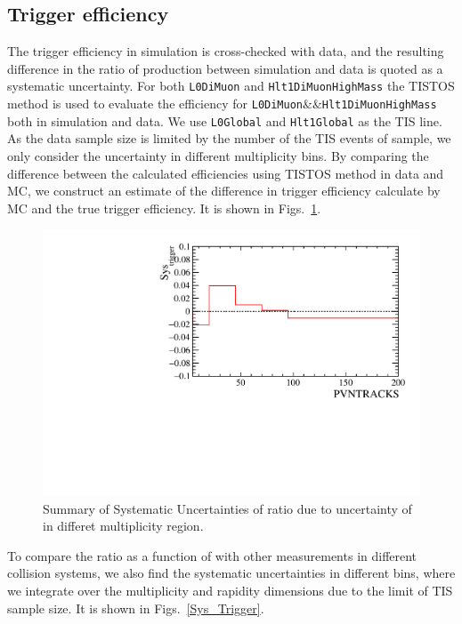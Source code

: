 \subsection{Trigger efficiency}
The trigger efficiency in simulation is cross-checked with data, and the resulting difference in the ratio of production between simulation and data is quoted as a systematic uncertainty. 
For both \texttt{L0DiMuon} and \texttt{Hlt1DiMuonHighMass} the TISTOS method is used to evaluate the efficiency for \texttt{L0DiMuon}\&\&\texttt{Hlt1DiMuonHighMass} both in simulation and data. 
We use \texttt{L0Global} and \texttt{Hlt1Global} as the TIS line.
As the data sample size is limited by the number of the TIS events of \psitwos sample, we only consider the uncertainty in different multiplicity bins. 
By comparing the difference between the calculated efficiencies using TISTOS method in data and MC, we construct an estimate of the difference in trigger efficiency calculate by MC and the true trigger efficiency. It is shown in Figs.~\ref{Sys_Trigger_N}.
\begin{figure}[H]
  \begin{center}
  \includegraphics[width=0.8\linewidth, totalheight=0.35\textheight]{pdf/SysTri_PVN.pdf}
  \end{center}
  \caption{
    Summary of Systematic Uncertainties of ratio due to uncertainty of \effTri in differet multiplicity region.}
  \label{Sys_Trigger_N}
\end{figure}
To compare the ratio as a function of \pt with other measurements in different collision systems, we also find the systematic uncertainties in different \pt bins, where we integrate over the multiplicity and rapidity dimensions due to the limit of TIS sample size. It is shown in Figs.~\ref{Sys_Trigger}.
